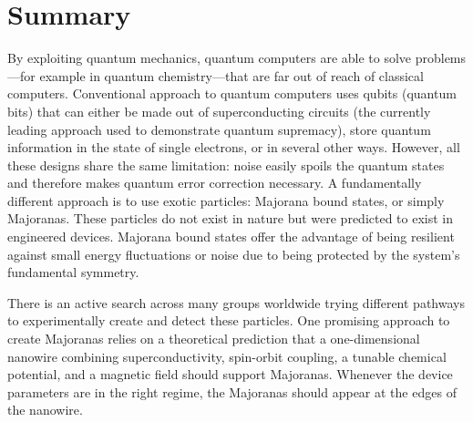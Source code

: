 \chapter*{Summary}

By exploiting quantum mechanics, quantum computers are able to solve problems---for example in quantum chemistry---that are far out of reach of classical computers.
Conventional approach to quantum computers uses qubits (quantum bits) that can either be made out of superconducting circuits (the currently leading approach used to demonstrate quantum supremacy), store quantum information in the state of single electrons, or in several other ways.
However, all these designs share the same limitation: noise easily spoils the quantum states and therefore makes quantum error correction necessary.
A fundamentally different approach is to use exotic particles: Majorana bound states, or simply Majoranas.
These particles do not exist in nature but were predicted to exist in engineered devices.
Majorana bound states offer the advantage of being resilient against small energy fluctuations or noise due to being protected by the system's fundamental symmetry.

There is an active search across many groups worldwide trying different pathways to experimentally create and detect these particles.
One promising approach to create Majoranas relies on a theoretical prediction that a one-dimensional nanowire combining superconductivity, spin-orbit coupling, a tunable chemical potential, and a magnetic field should support Majoranas.
Whenever the device parameters are in the right regime, the Majoranas should appear at the edges of the nanowire.

